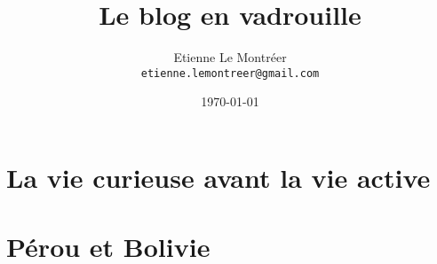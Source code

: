 \documentclass[a5paper, 10pt]{book}
\begin{document}
\frontmatter
\title{Le blog en vadrouille}
\author{Etienne Le Montr\'eer\\
  \texttt{etienne.lemontreer@gmail.com}}
\date{\today}

\maketitle

\tableofcontents

\mainmatter

%
\pagebreak
\pagebreak
\pagebreak
\pagebreak
\pagebreak
\pagebreak
\pagebreak
\pagebreak
\pagebreak
\pagebreak
\pagebreak

\chapter{La vie curieuse avant la vie active}

\pagebreak
\pagebreak
\pagebreak
\pagebreak
\pagebreak
\pagebreak
\pagebreak
\pagebreak
\pagebreak
\pagebreak
\pagebreak
\pagebreak
\pagebreak
\pagebreak
\pagebreak
\pagebreak
\pagebreak
\pagebreak

\chapter{Pérou et Bolivie}

\pagebreak
\pagebreak
\pagebreak
\pagebreak
\end{document}
